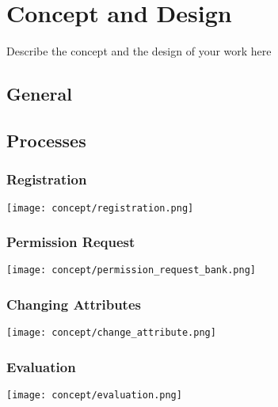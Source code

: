 \chapter{Concept and Design}
\label{cha:conceptanddesign}

Describe the concept and the design of your work here

\section{General}

\section{Processes}

\subsection{Registration}

 \texttt{[image: concept/registration.png]}

\subsection{Permission Request}

 \texttt{[image: concept/permission\_request\_bank.png]}

\subsection{Changing Attributes}

 \texttt{[image: concept/change\_attribute.png]}

\subsection{Evaluation}

 \texttt{[image: concept/evaluation.png]}